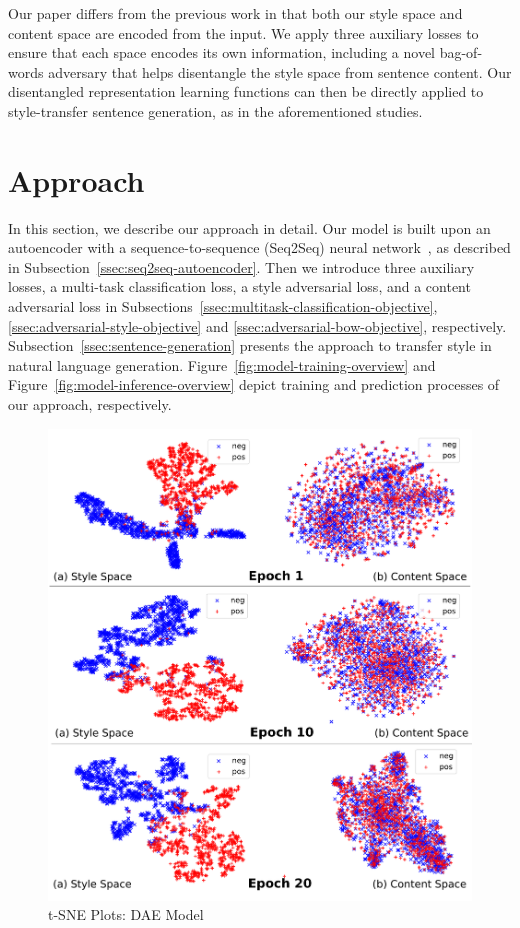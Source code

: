 \documentclass[11pt,a4paper]{article}
\begin{document}
Our paper differs from the previous work in that both our style space and content space are encoded from the input. We apply three auxiliary losses to ensure that each space encodes its own information, including a novel bag-of-words adversary that helps disentangle the style space from sentence content. Our disentangled representation learning functions can then be directly applied to style-transfer sentence generation, as in the aforementioned studies.


\section{Approach}

In this section, we describe our approach in detail. Our model is built upon an autoencoder with a sequence-to-sequence (Seq2Seq) neural network~\cite{sutskever2014sequence}, as described in Subsection~\ref{ssec:seq2seq-autoencoder}. Then we introduce three auxiliary losses, a multi-task classification loss, a style adversarial loss, and a content adversarial loss in Subsections~\ref{ssec:multitask-classification-objective}, \ref{ssec:adversarial-style-objective} and \ref{ssec:adversarial-bow-objective}, respectively. Subsection~\ref{ssec:sentence-generation} presents the approach to transfer style in natural language generation. Figure~\ref{fig:model-training-overview} and Figure~\ref{fig:model-inference-overview} depict training and prediction processes of our approach, respectively.


\begin{figure}[ht]
	\captionsetup{justification=centering}
	\includegraphics[width=\linewidth]{latent-spaces-dae}
	\caption{t-SNE Plots: DAE Model}
	\label{fig:dae-tsne}
\end{figure}
\end{document}
